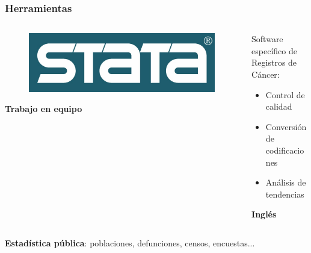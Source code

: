 \documentclass{beamer}
\begin{document}

\begin{frame}\frametitle{Herramientas}
	
	\begin{columns}
		\begin{column}{0.4\textwidth}
			\begin{figure}
				\centering
				\includegraphics[width=.7\textwidth]{images/stata.jpg}
			\end{figure}
		
			\vspace{50pt}
			
			\centering
			\textbf{Trabajo en equipo}
			
		\end{column}
		\begin{column}{0.6\textwidth}
			\centering
			Software específico de Registros de Cáncer:\\

			\begin{itemize}
				\item 			\centering Control de calidad
				\item 			\centering Conversión de codificaciones
				\item 			\centering Análisis de tendencias
			\end{itemize}	
			\vspace{41pt}
			\centering
			\textbf{Inglés}
		\end{column}
	\end{columns}
	
	\vspace{25pt}
	\centering
	\textbf{Estadística pública}: poblaciones, defunciones, censos, encuestas...
	
\end{frame}
\end{document}
